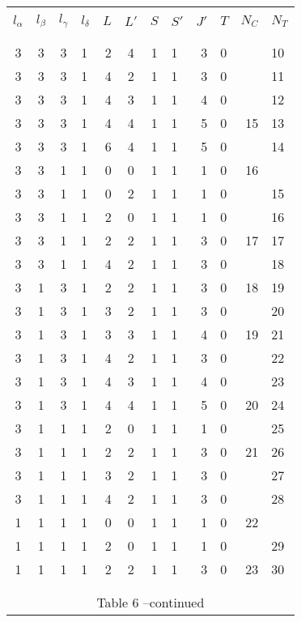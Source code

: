 \clearpage
\begin{table}
\begin{center}
\begin{tabular}{cccl rccl rlrl}
\hline
&&&&&&&&&&&\\
$l_{\alpha}$ & $l_{\beta}$ & $l_{\gamma}$ & $l_{\delta}$\hspace{.5cm} &
\hspace{.5cm}$L$ & $L'$ & $S$ & $S'$\hspace{.5cm} &
\hspace{.5cm}$J'$ & $T$\hspace{.5cm} & \hspace{.5cm}$N_C$ &
$N_T$\hspace{.5cm} \\
&&&&&&&&&&&\\
\hline
&&&&&&&&&&&\\
 3 & 3 & 3 & 1 & 2 & 4 & 1 & 1 & 3 & 0 & & 10 \\
 3 & 3 & 3 & 1 & 4 & 2 & 1 & 1 & 3 & 0 & & 11 \\
 3 & 3 & 3 & 1 & 4 & 3 & 1 & 1 & 4 & 0 & & 12 \\
 3 & 3 & 3 & 1 & 4 & 4 & 1 & 1 & 5 & 0 & 15 & 13 \\
 3 & 3 & 3 & 1 & 6 & 4 & 1 & 1 & 5 & 0 & & 14 \\
 3 & 3 & 1 & 1 & 0 & 0 & 1 & 1 & 1 & 0 & 16 &  \\
 3 & 3 & 1 & 1 & 0 & 2 & 1 & 1 & 1 & 0 & & 15 \\
 3 & 3 & 1 & 1 & 2 & 0 & 1 & 1 & 1 & 0 & & 16 \\
 3 & 3 & 1 & 1 & 2 & 2 & 1 & 1 & 3 & 0 & 17 & 17 \\
 3 & 3 & 1 & 1 & 4 & 2 & 1 & 1 & 3 & 0 & & 18 \\
 3 & 1 & 3 & 1 & 2 & 2 & 1 & 1 & 3 & 0 & 18 & 19 \\
 3 & 1 & 3 & 1 & 3 & 2 & 1 & 1 & 3 & 0 & & 20 \\
 3 & 1 & 3 & 1 & 3 & 3 & 1 & 1 & 4 & 0 & 19 & 21 \\
 3 & 1 & 3 & 1 & 4 & 2 & 1 & 1 & 3 & 0 & & 22 \\
 3 & 1 & 3 & 1 & 4 & 3 & 1 & 1 & 4 & 0 & & 23 \\
 3 & 1 & 3 & 1 & 4 & 4 & 1 & 1 & 5 & 0 & 20 & 24 \\
 3 & 1 & 1 & 1 & 2 & 0 & 1 & 1 & 1 & 0 & & 25 \\
 3 & 1 & 1 & 1 & 2 & 2 & 1 & 1 & 3 & 0 & 21 & 26 \\
 3 & 1 & 1 & 1 & 3 & 2 & 1 & 1 & 3 & 0 & & 27 \\
 3 & 1 & 1 & 1 & 4 & 2 & 1 & 1 & 3 & 0 & & 28 \\
 1 & 1 & 1 & 1 & 0 & 0 & 1 & 1 & 1 & 0 & 22 &  \\
 1 & 1 & 1 & 1 & 2 & 0 & 1 & 1 & 1 & 0 & & 29 \\
 1 & 1 & 1 & 1 & 2 & 2 & 1 & 1 & 3 & 0 & 23 & 30 \\
&&&&&&&&&&&\\
\hline
&&&&&&&&&&&\\
\multicolumn{12}{c}{Table 6 --continued}\\
\end{tabular}
\end{center}
\end{table}
